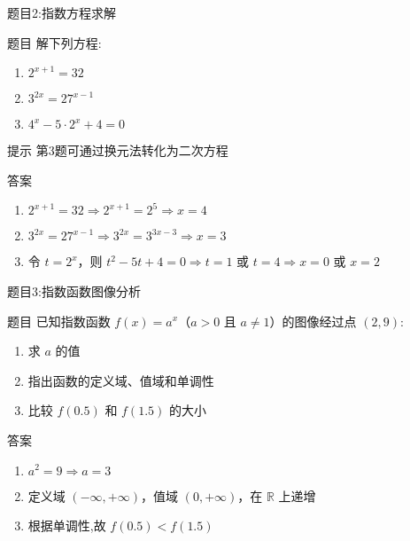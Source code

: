   \begin{frame}{题目2:指数方程求解}
    \begin{block}{题目}
        解下列方程:
        \begin{enumerate}
            \item $2^{x+1} = 32$
            \item $3^{2x} = 27^{x-1}$
            \item $4^{x} - 5 \cdot 2^{x} + 4 = 0$
        \end{enumerate}
    \end{block}
    
    \begin{alertblock}{提示}
        第3题可通过换元法转化为二次方程
    \end{alertblock}
    \pause
      
    \begin{block}{答案}
        \begin{enumerate}
            \item $2^{x+1} = 32 \Rightarrow 2^{x+1} = 2^5 \Rightarrow x = 4$
            \item $3^{2x} = 27^{x-1} \Rightarrow 3^{2x} = 3^{3x-3} \Rightarrow x = 3$
            \item 令 $t=2^x$，则 $t^2 - 5t + 4 = 0 \Rightarrow t=1$ 或 $t=4 \Rightarrow x=0$ 或 $x=2$
        \end{enumerate}
    \end{block}
  \end{frame}
  
  
  \begin{frame}{题目3:指数函数图像分析}
    \begin{block}{题目}
        已知指数函数 $f(x) = a^x$（$a > 0$ 且 $a \neq 1$）的图像经过点 $(2, 9)$:
        \begin{enumerate}
            \item 求 $a$ 的值
            \item 指出函数的定义域、值域和单调性
            \item 比较 $f(0.5)$ 和 $f(1.5)$ 的大小
        \end{enumerate}
    \end{block}
    
    \pause
    
    \begin{block}{答案}
        \begin{enumerate}
            \item $a^2 = 9 \Rightarrow a = 3$
            \item 定义域 $(-\infty,+\infty)$，值域 $(0,+\infty)$，在 $\mathbb{R}$ 上递增
            \item 根据单调性,故 $f(0.5) < f(1.5)$
        \end{enumerate}
    \end{block}
  \end{frame}
  
